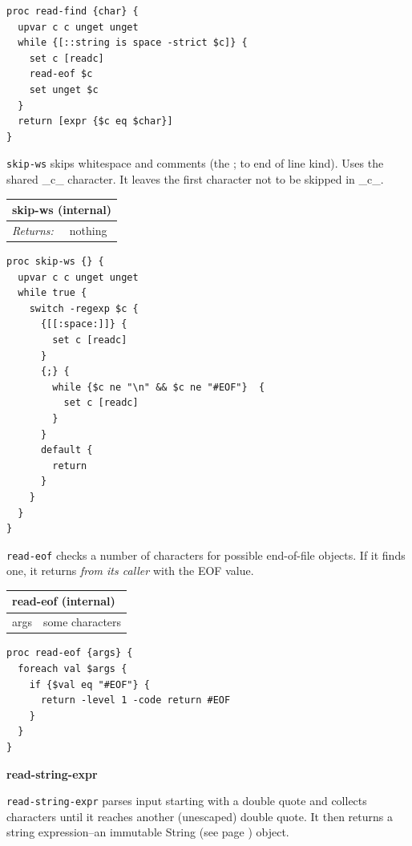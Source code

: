 \documentclass[twoside,9pt]{report}
\begin{document}
\noindent\makebox[\linewidth]{\rule{\linewidth}{0.4pt}}
\begin{lstlisting}
proc read-find {char} {
  upvar c c unget unget
  while {[::string is space -strict $c]} {
    set c [readc]
    read-eof $c
    set unget $c
  }
  return [expr {$c eq $char}]
}
\end{lstlisting}
\noindent\makebox[\linewidth]{\rule{\linewidth}{0.4pt}}

\texttt{skip-ws} skips whitespace and comments (the ; to end of line kind). Uses the shared \_c\_ character. It leaves the first character not to be skipped in \_c\_.

\begin{tabular}{ |l l| }
\hline
\multicolumn{2}{|l|}{skip-ws (internal)} \\
\hline
\textit{Returns:} & nothing \\
\hline
\end{tabular}

\noindent\makebox[\linewidth]{\rule{\linewidth}{0.4pt}}
\begin{lstlisting}
proc skip-ws {} {
  upvar c c unget unget
  while true {
    switch -regexp $c {
      {[[:space:]]} {
        set c [readc]
      }
      {;} {
        while {$c ne "\n" && $c ne "#EOF"}  {
          set c [readc]
        }
      }
      default {
        return
      }
    }
  }
}
\end{lstlisting}
\noindent\makebox[\linewidth]{\rule{\linewidth}{0.4pt}}

\texttt{read-eof} checks a number of characters for possible end-of-file objects. If it finds one, it returns \emph{from its caller} with the EOF value.

\begin{tabular}{ |l l| }
\hline
\multicolumn{2}{|l|}{read-eof (internal)} \\
\hline
args & some characters \\
\hline
\end{tabular}

\noindent\makebox[\linewidth]{\rule{\linewidth}{0.4pt}}
\begin{lstlisting}
proc read-eof {args} {
  foreach val $args {
    if {$val eq "#EOF"} {
      return -level 1 -code return #EOF
    }
  }
}
\end{lstlisting}
\noindent\makebox[\linewidth]{\rule{\linewidth}{0.4pt}}

\textbf{read-string-expr}


\texttt{read-string-expr} parses input starting with a double quote and collects characters until it reaches another (unescaped) double quote. It then returns a string expression--an immutable String (see page \pageref{strings}) object.
\end{document}
